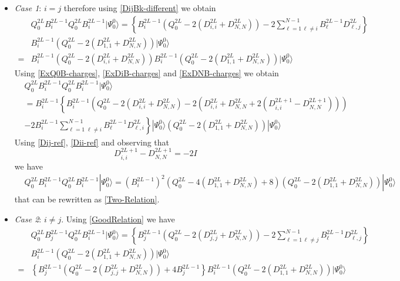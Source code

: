\documentclass[10pt]{article}
\numberwithin{equation}{section}
\numberwithin{equation}{subsection}
\begin{document}
\begin{itemize}
	\item \textit{Case 1}: $i=j$ therefore using \eqref{DijBk-different} we obtain 
	\begin{align}
		&Q_{0}^{2L}B_{i}^{2L-1}Q_{0}^{2L}B_{i}^{2L-1}|\Psi_{0}^{0}\rangle=\left\{B_{i}^{2L-1}\left(Q_{0}^{2L}-2(D_{i,i}^{2L}+D_{N,N}^{2L})\right)-2\sum_{\ell=1\,\ell\neq i}^{N-1}B_{\ell}^{2L-1}D_{\ell,j}^{2L}\right\}\nonumber\\&B_{i}^{2L-1}\left(Q_{0}^{2L}-2(D_{1,1}^{2L}+D_{N,N}^{2L})\right)|\Psi_{0}^{0}\rangle
		\\=&
		B_{i}^{2L-1}\left(Q_{0}^{2L}-2(D_{i,i}^{2L}+D_{N,N}^{2L})\right)B_{i}^{2L-1}\left(Q_{0}^{2L}-2(D_{1,1}^{2L}+D_{N,N}^{2L})\right)|\Psi_{0}^{0}\rangle
	\end{align}
Using \eqref{ExQ0B-charges}, \eqref{ExDiB-charges} and \eqref{ExDNB-charges} we obtain 
\begin{align}
	&Q_{0}^{2L}B_{i}^{2L-1}Q_{0}^{2L}B_{i}^{2L-1}|\Psi_{0}^{0}\rangle\nonumber\\&=B_{i}^{2L-1}\left\{B_{i}^{2L-1}\left(Q_{0}^{2L}-2(D_{i,i}^{2L}+D_{N,N}^{2L})-2(D_{i,i}^{2L}+D_{N,N}^{2L}+2(D_{i,i}^{2L+1}-D_{N,N}^{2L+1}))\right)\right.\nonumber\\&\left.-2B_{i}^{2L-1}\sum_{\ell=1\;\ell\neq i}^{N-1}B_{\ell}^{2L-1}D_{\ell,i}^{2L}\right\}|\Psi_{0}^{0}\rangle
	\left(Q_{0}^{2L}-2(D_{1,1}^{2L}+D_{N,N}^{2L})\right)|\Psi_{0}^{0}\rangle
\end{align}
Using \eqref{Dij-ref}, \eqref{Dii-ref} and observing that 
\begin{equation}\label{D2Lp1}
	D_{i,i}^{2L+1}-D_{N,N}^{2L+1}=-2I
\end{equation}
we have 
\begin{align}
	&Q_{0}^{2L}B_{i}^{2L-1}Q_{0}^{2L}B_{i}^{2L-1}|\Psi_{0}^{0}\rangle\nonumber=\left(B_{i}^{2L-1}\right)^{2}\left(Q_{0}^{2L}-4(D_{1,1}^{2L}+D_{N,N}^{2L})+8\right)\left(Q_{0}^{2L}-2(D_{1,1}^{2L}+D_{N,N}^{2L})\right)|\Psi_{0}^{0}\rangle
\end{align}
that can be rewritten as \eqref{Two-Relation}.
\item \textit{Case 2}: $i\neq j$. Using \eqref{GoodRelation} we have
\begin{align}
	&Q_{0}^{2L}B_{j}^{2L-1}Q_{0}^{2L}B_{i}^{2L-1}|\Psi_{0}^{0}\rangle=\left\{B_{j}^{2L-1}\left(Q_{0}^{2L}-2(D_{j,j}^{2L}+D_{N,N}^{2L})\right)-2\sum_{\ell=1\,\ell\neq j}^{N-1}B_{\ell}^{2L-1}D_{\ell,j}^{2L}\right\}\\&
	B_{i}^{2L-1}\left(Q_{0}^{2L}-2(D_{1,1}^{2L}+D_{N,N}^{2L})\right)|\Psi_{0}^{0}\rangle\nonumber\\=&\left\{B_{j}^{2L-1}\left(Q_{0}^{2L}-2(D_{j,j}^{2L}+D_{N,N}^{2L})\right)+4B_{j}^{2L-1}\right\}B_{i}^{2L-1}\left(Q_{0}^{2L}-2(D_{1,1}^{2L}+D_{N,N}^{2L})\right)|\Psi_{0}^{0}\rangle

\end{align}
\end{itemize}
\end{document}
